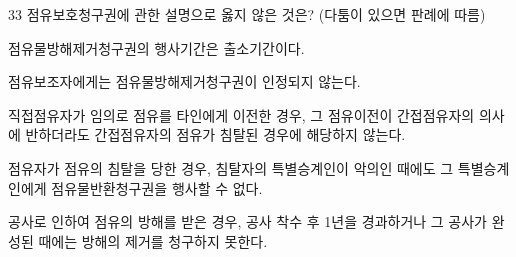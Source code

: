 \begin{question}{33}
점유보호청구권에 관한 설명으로 옳지 않은 것은? (다툼이 있으면 판례에 따름)
\begin{choices}
  \item 점유물방해제거청구권의 행사기간은 출소기간이다.
  \item 점유보조자에게는 점유물방해제거청구권이 인정되지 않는다.
  \item 직접점유자가 임의로 점유를 타인에게 이전한 경우, 그 점유이전이 간접점유자의 의사에 반하더라도 간접점유자의 점유가 침탈된 경우에 해당하지 않는다.
  \item 점유자가 점유의 침탈을 당한 경우, 침탈자의 특별승계인이 악의인 때에도 그 특별승계인에게 점유물반환청구권을 행사할 수 없다.
  \item 공사로 인하여 점유의 방해를 받은 경우, 공사 착수 후 1년을 경과하거나 그 공사가 완성된 때에는 방해의 제거를 청구하지 못한다.
\end{choices}
\end{question}
